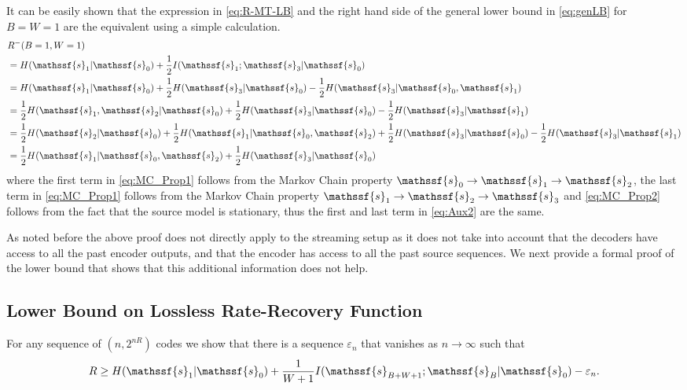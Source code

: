 \documentclass[journal, twocolumn, 10pt]{IEEEtran}
\newcommand{\eps}{\varepsilon}
\newcommand{\rvs}{{\mathssf{s}}}    %
\begin{document}
It can be easily shown that the expression in \eqref{eq:R-MT-LB} and the right hand side of the general lower bound in \eqref{eq:genLB} for $B=W=1$ are the equivalent using a simple calculation.
\begin{align}
&R^-(B=1,W=1) \notag\\
&= H(\rvs_1|\rvs_0)+ \frac{1}{2}I(\rvs_1;\rvs_{3}|\rvs_0)\notag\\
&= H(\rvs_1|\rvs_0) + \frac{1}{2}H(\rvs_3|\rvs_0) -\frac{1}{2}H(\rvs_3 | \rvs_0, \rvs_1)\notag\\
&=\frac{1}{2}H(\rvs_1, \rvs_2 | \rvs_0) + \frac{1}{2}H(\rvs_3 | \rvs_0) - \frac{1}{2}H(\rvs_3 | \rvs_1)\label{eq:MC_Prop1}\\
& = \frac{1}{2}H(\rvs_2 | \rvs_0) + \frac{1}{2}H(\rvs_1|\rvs_0,\rvs_2) + \frac{1}{2}H(\rvs_3 | \rvs_0) - \frac{1}{2}H(\rvs_3 | \rvs_1)\label{eq:Aux2}\\
&= \frac{1}{2}H(\rvs_1|\rvs_0,\rvs_2) + \frac{1}{2}H(\rvs_3|\rvs_0)\label{eq:MC_Prop2}
\end{align}
where  the first term in \eqref{eq:MC_Prop1} follows from the Markov Chain property $\rvs_0 \rightarrow\rvs_1 \rightarrow \rvs_2$, the last term in \eqref{eq:MC_Prop1} follows from the Markov Chain property $\rvs_1 \rightarrow \rvs_2 \rightarrow \rvs_3$ and \eqref{eq:MC_Prop2} follows from the fact that the source model is stationary, thus the first and last term in \eqref{eq:Aux2} are the same.

As noted before the above proof  does not directly apply to the streaming setup as it does not take into account that the decoders have access to all the past encoder outputs, and that the encoder has access to all the past source sequences. We next provide a formal proof of the lower bound that shows that this additional information does not help.

\subsection{Lower Bound on Lossless Rate-Recovery Function}
\label{subsec:genLB}

For any sequence of $(n,2^{nR})$ codes we show that there is a sequence $\eps_n$ that vanishes as $n \rightarrow \infty$ such that
\begin{align}
R \ge H(\rvs_1|\rvs_0) + \frac{1}{W+1} I(\rvs_{B+W+1}; \rvs_B| \rvs_0) - \eps_n \label{eq:rate_UB}.
\end{align}
\end{document}
